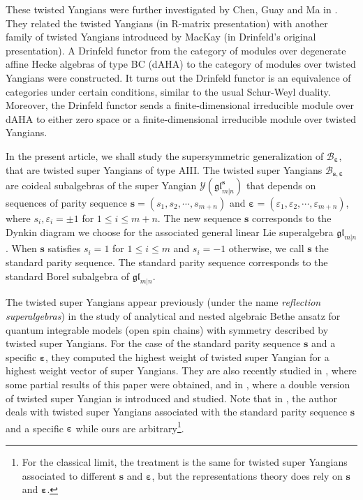 \documentclass[11pt,reqno]{amsart}
\numberwithin{equation}{section}
\theoremstyle{definition}
\theoremstyle{remark}
\newcommand{\gl}{\mathfrak{gl}}
\newcommand{\lle}{\leqslant}
\newcommand{\ve}{\varepsilon}
\newcommand{\s}{{\bm s}}
\begin{document}
These twisted Yangians were further investigated by Chen, Guay and Ma in \cite{Chen2014twisted}. They related the twisted Yangians (in R-matrix presentation) with another family of twisted Yangians introduced by MacKay \cite{MacKay2002rational} (in Drinfeld's original presentation). A Drinfeld functor from the category of modules over degenerate affine Hecke algebras of type BC (dAHA) to the category of modules over twisted Yangians were constructed. It turns out the Drinfeld functor is an equivalence of categories under certain conditions, similar to the usual Schur-Weyl duality. Moreover, the Drinfeld functor sends a finite-dimensional irreducible module over dAHA to either zero space or a finite-dimensional irreducible module over twisted Yangians.

In the present article, we shall study the supersymmetric generalization of $\mathscr B_{\bm\ve}$, that are twisted super Yangians of type AIII. The twisted super Yangians $\mathscr B_{\s,\bm\ve}$ are coideal subalgebras of the super Yangian $\mathscr Y(\gl_{m|n}^\s)$ that depends on sequences of parity sequence $\s=(s_1,s_2,\cdots,s_{m+n})$ and $\bm\ve=(\ve_1,\ve_2,\cdots,\ve_{m+n})$, where $s_i,\ve_i=\pm 1$ for $1\lle i\lle m+n$. The new sequence $\s$ corresponds to the Dynkin diagram we choose for the associated general linear Lie superalgebra $\gl_{m|n}$. When $\s$ satisfies $s_i=1$ for $1\lle i\lle m$ and $s_i=-1$ otherwise, we call $\s$ the standard parity sequence. The standard parity sequence corresponds to the standard Borel subalgebra of $\gl_{m|n}$.

The twisted super Yangians appear previously (under the name \emph{reflection superalgebras}) in the study of analytical and nested algebraic Bethe ansatz \cite{Ragoucy2007analytical,Belliard2009nested} for quantum integrable models (open spin chains) with symmetry described by twisted super Yangians. For the case of the standard parity sequence $\s$ and a specific $\bm\ve$, they computed the highest weight of twisted super Yangian for a highest weight vector of super Yangians. They are also recently studied in \cite{kettle2023orthosymplectic}, where some partial results of this paper were obtained, and in \cite{bagnoli2023double}, where a double version of twisted super Yangian is introduced and studied. Note that in \cite{kettle2023orthosymplectic,bagnoli2023double}, the author deals with twisted super Yangians associated with the standard parity sequence $\s$ and a specific $\bm\ve$ while ours are arbitrary\footnote{For the classical limit, the treatment is the same for twisted super Yangians associated to different $\s$ and $\bm\ve$, but the representations theory does rely on $\s$ and $\bm\ve$.}.
\end{document}
